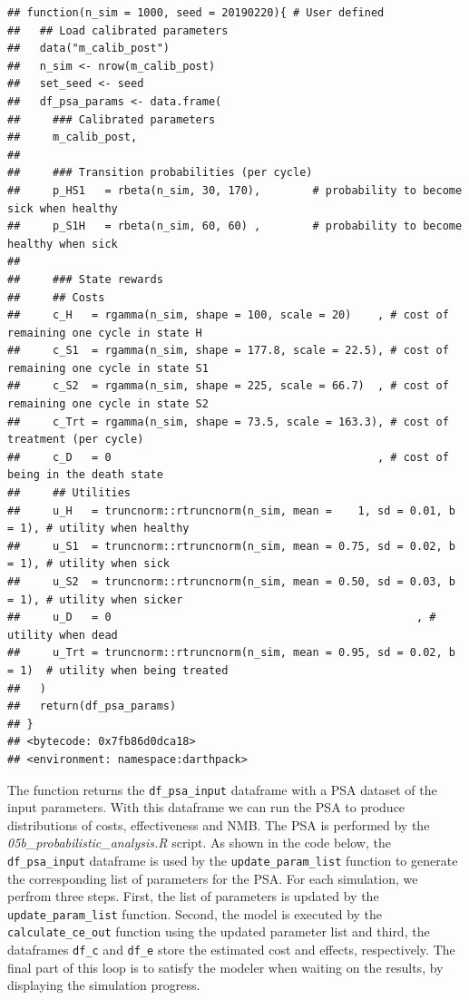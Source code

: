 \documentclass[]{book}
\begin{document}
\begin{verbatim}
## function(n_sim = 1000, seed = 20190220){ # User defined
##   ## Load calibrated parameters
##   data("m_calib_post")
##   n_sim <- nrow(m_calib_post)
##   set_seed <- seed
##   df_psa_params <- data.frame(
##     ### Calibrated parameters
##     m_calib_post,
##     
##     ### Transition probabilities (per cycle)
##     p_HS1   = rbeta(n_sim, 30, 170),        # probability to become sick when healthy
##     p_S1H   = rbeta(n_sim, 60, 60) ,        # probability to become healthy when sick
##     
##     ### State rewards
##     ## Costs
##     c_H   = rgamma(n_sim, shape = 100, scale = 20)    , # cost of remaining one cycle in state H
##     c_S1  = rgamma(n_sim, shape = 177.8, scale = 22.5), # cost of remaining one cycle in state S1
##     c_S2  = rgamma(n_sim, shape = 225, scale = 66.7)  , # cost of remaining one cycle in state S2
##     c_Trt = rgamma(n_sim, shape = 73.5, scale = 163.3), # cost of treatment (per cycle)
##     c_D   = 0                                         , # cost of being in the death state
##     ## Utilities
##     u_H   = truncnorm::rtruncnorm(n_sim, mean =    1, sd = 0.01, b = 1), # utility when healthy
##     u_S1  = truncnorm::rtruncnorm(n_sim, mean = 0.75, sd = 0.02, b = 1), # utility when sick
##     u_S2  = truncnorm::rtruncnorm(n_sim, mean = 0.50, sd = 0.03, b = 1), # utility when sicker
##     u_D   = 0                                               , # utility when dead
##     u_Trt = truncnorm::rtruncnorm(n_sim, mean = 0.95, sd = 0.02, b = 1)  # utility when being treated
##   )
##   return(df_psa_params)
## }
## <bytecode: 0x7fb86d0dca18>
## <environment: namespace:darthpack>
\end{verbatim}

The function returns the \texttt{df\_psa\_input} dataframe with a PSA
dataset of the input parameters. With this dataframe we can run the PSA
to produce distributions of costs, effectiveness and NMB. The PSA is
performed by the \emph{05b\_probabilistic\_analysis.R} script. As shown
in the code below, the \texttt{df\_psa\_input} dataframe is used by the
\texttt{update\_param\_list} function to generate the corresponding list
of parameters for the PSA. For each simulation, we perfrom three steps.
First, the list of parameters is updated by the
\texttt{update\_param\_list} function. Second, the model is executed by
the \texttt{calculate\_ce\_out} function using the updated parameter
list and third, the dataframes \texttt{df\_c} and \texttt{df\_e} store
the estimated cost and effects, respectively. The final part of this
loop is to satisfy the modeler when waiting on the results, by
displaying the simulation progress.
\end{document}
